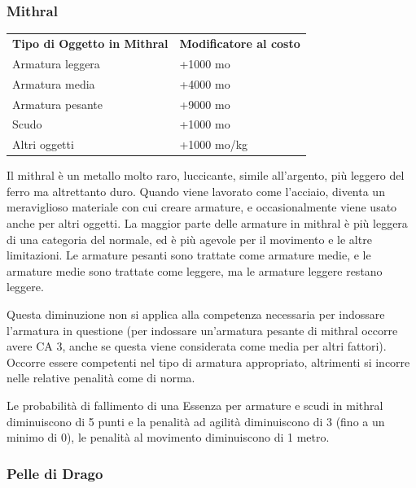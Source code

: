\documentclass[a4paper,11pt,twoside,openany]{book}
\begin{document}
\subsubsection{Mithral}

\label{mithral}

\begin{tabular}{ll}
	\toprule
	\textbf{Tipo di Oggetto in Mithral} & \textbf{Modificatore al costo}\\
	Armatura leggera                    & +1000 mo\\
	Armatura media                      & +4000 mo\\
	Armatura pesante                    & +9000 mo\\
	Scudo                               & +1000 mo\\
	Altri oggetti                       & +1000 mo/kg\\
\end{tabular}

\bigskip

Il mithral è un metallo molto raro, luccicante, simile all'argento, più leggero del ferro ma altrettanto duro. Quando viene lavorato come l'acciaio, diventa un meraviglioso materiale con cui creare armature, e occasionalmente viene usato anche per altri oggetti. La maggior parte delle armature in mithral è più leggera di una categoria del normale, ed è più agevole per il movimento e le altre limitazioni. Le armature pesanti sono trattate come armature medie, e le armature medie sono trattate come leggere, ma le armature leggere restano leggere.

Questa diminuzione non si applica alla competenza necessaria per indossare l'armatura in questione (per indossare un'armatura pesante di mithral occorre avere CA 3, anche se questa viene considerata come media per altri fattori). Occorre essere competenti nel tipo di armatura appropriato, altrimenti si incorre nelle relative penalità come di norma.

Le probabilità di fallimento di una Essenza per armature e scudi in mithral diminuiscono di 5 punti e la penalità ad agilità diminuiscono di 3 (fino a un minimo di 0), le penalità al movimento diminuiscono di 1 metro.

\subsubsection{Pelle di Drago}

\label{pelle-di-drago}
\end{document}
